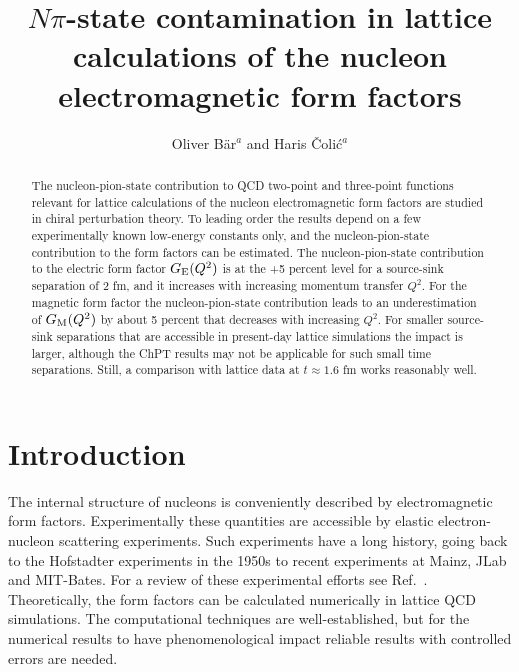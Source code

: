 \documentclass[11pt,prd,aps,showpacs,eqsecnum,floatfix,nofootinbib,preprint,tightenlines]{revtex4}
\begin{document}
\renewcommand{\thefootnote}{$*$}


\title{$N\pi$-state contamination in lattice calculations of the nucleon electromagnetic form factors}

\author{Oliver B\"ar$^{a}$ and Haris \v{C}oli\'{c}$^{a}$} 

\begin{abstract}
The nucleon-pion-state contribution to QCD two-point and three-point functions relevant for lattice calculations of the nucleon electromagnetic form factors are studied in chiral perturbation theory. 
To leading order the results depend on a few experimentally known low-energy constants only, and the nucleon-pion-state contribution to the form factors can be estimated. The nucleon-pion-state contribution to the electric form factor $G_{\rm E}(Q^2)$ is at the +5 percent level for a source-sink separation of 2 fm, and it increases with increasing momentum transfer $Q^2$. For the magnetic form factor  the nucleon-pion-state contribution leads to an  underestimation of $G_{\rm M}(Q^2)$ by about 5 percent that decreases with increasing $Q^2$. 
For smaller source-sink separations that are accessible in present-day lattice simulations the impact is larger, although  the ChPT results may not be applicable for such small  time separations. Still, a comparison with lattice data at $t\approx 1.6$ fm works reasonably well.
\end{abstract}

\maketitle

\renewcommand{\thefootnote}{\arabic{footnote}} \setcounter{footnote}{0}

\newpage
\section{Introduction}\label{Intro} 

The internal structure of nucleons is conveniently described by electromagnetic form factors. 
Experimentally these quantities are accessible by elastic electron-nucleon scattering experiments. Such experiments have a long history, going back to the Hofstadter experiments in the 1950s to recent experiments at Mainz, JLab and MIT-Bates. For a review of these experimental efforts see Ref.\ \cite{Punjabi:2015bba}.
Theoretically, the form factors can be calculated numerically in lattice QCD simulations. The computational techniques are well-established, but for the numerical results to have phenomenological impact reliable results with controlled errors are needed. 
\end{document}
